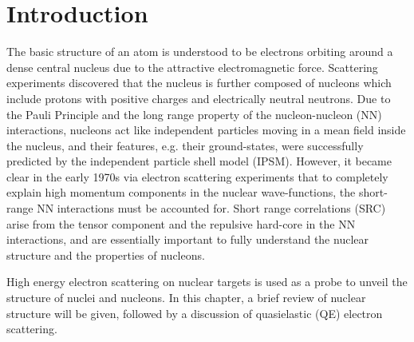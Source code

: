 \chapter{Introduction}
The basic structure of an atom is understood to be electrons orbiting around a dense central nucleus due to the attractive electromagnetic force. Scattering experiments discovered that the nucleus is further composed of nucleons which include protons with positive charges and electrically neutral neutrons. Due to the Pauli Principle and the long range property of the nucleon-nucleon (NN) interactions, nucleons act like independent particles moving in a mean field inside the nucleus, and their features, e.g. their ground-states, were successfully predicted by the independent particle shell model (IPSM). However, it became clear in the early 1970s via electron scattering experiments that to completely explain high momentum components in the nuclear wave-functions, the short-range NN interactions must be accounted for. Short range correlations (SRC) arise from the tensor component and the repulsive hard-core in the NN interactions, and are essentially important to fully understand the nuclear structure and the properties of nucleons. 

  High energy electron scattering on nuclear targets is used as a probe to unveil the structure of nuclei and nucleons. In this chapter, a brief review of nuclear structure will be given, followed by a discussion of quasielastic (QE) electron scattering.
 


